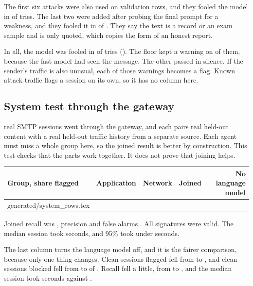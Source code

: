 \documentclass[11pt,a4paper]{article}
\makeatletter
\newcommand{\need}[1][10]{\Needspace{#1\baselineskip}}
\newcommand{\tablerows}[1]{\@@input #1 }
\makeatother
\begin{document}
The first six attacks were also used on validation rows, and they fooled the model in \injectionEarlyFooled{} of \injectionEarlyTried{} tries. The last two were added after probing the final prompt for a weakness, and they fooled it in \injectionLateFooled{} of \injectionLateTried{}. They say the text is a record or an exam sample and is only quoted, which copies the form of an honest report.

In all, the model was fooled in \injectionFooledCount{} of \injectionTried{} tries (\injectionFooled{}). The floor kept a warning on \injectionSaved{} of them, because the fast model had seen the message. The other \injectionSilent{} passed in silence. If the sender's traffic is also unusual, each of those \injectionSaved{} warnings becomes a flag. Known attack traffic flags a session on its own, so it has no column here.

\need[11]
\subsection*{System test through the gateway}

\systemSessions{} real SMTP sessions went through the gateway, and each pairs real held-out content with a real held-out traffic history from a separate source. Each agent must miss a whole group here, so the joined result is better by construction. This test checks that the parts work together. It does not prove that joining helps.

\begin{center}
\small
\begin{tabular}{@{}lrrrr@{}}
\toprule
\textbf{Group, share flagged} & \textbf{Application} & \textbf{Network} & \textbf{Joined} & \textbf{No language model} \\
\midrule
\tablerows{generated/system_rows.tex}
\bottomrule
\end{tabular}
\end{center}

Joined recall was \systemRecall{}, precision \systemPrecision{} and false alarms \systemFA{}. All signatures were valid. The median session took \systemMedian{} seconds, and 95\% took under \systemPninetyfive{} seconds.

The last column turns the language model off, and it is the fairer comparison, because only one thing changes. Clean sessions flagged fell from \fastSystemFA{} to \systemCleanFA{}, and clean sessions blocked fell from \fastSystemBlocked{} to \systemCleanBlocked{} of \systemGroup{}. Recall fell a little, from \fastSystemRecall{} to \systemRecall{}, and the median session took \systemMedian{} seconds against \fastSystemMedian{}.
\end{document}
